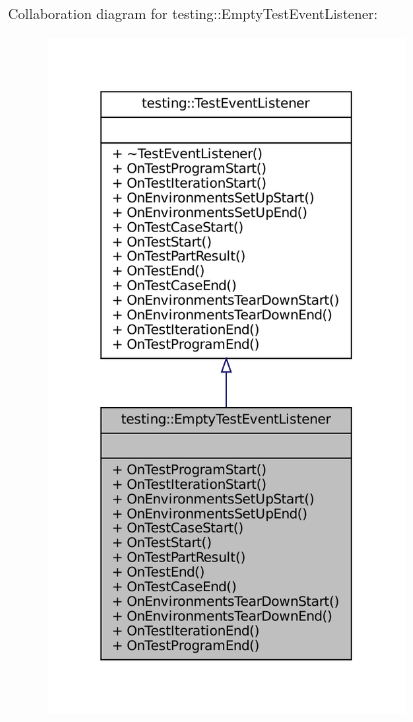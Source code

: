 Collaboration diagram for testing\+:\+:Empty\+Test\+Event\+Listener\+:
\nopagebreak
\begin{figure}[H]
\begin{center}
\leavevmode
\includegraphics[width=268pt]{classtesting_1_1EmptyTestEventListener__coll__graph}
\end{center}
\end{figure}
